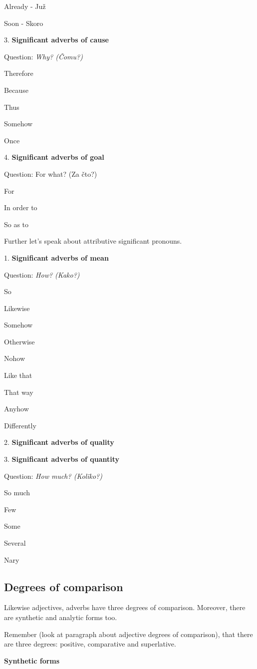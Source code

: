 Already - Juž

Soon - Skoro

3. \textbf{Significant adverbs of cause}

Question: \textit{Why? (Čomu?)}

Therefore

Because

Thus

Somehow

Once


4. \textbf{Significant adverbs of goal}

Question: For what? (Za čto?)

For

In order to

So as to


Further let’s speak about attributive significant pronouns.

1. \textbf{Significant adverbs of mean}

Question: \textit{How? (Kako?)}

So

Likewise

Somehow

Otherwise

Nohow

Like that

That way

Anyhow

Differently

2. \textbf{Significant adverbs of quality}


3.\textbf{ Significant adverbs of quantity}

Question: \textit{How much? (Kolïko?)}

So much

Few

Some

Several

Nary

\subsection{Degrees of comparison}

Likewise adjectives, adverbs have three degrees of comparison. Moreover, there are synthetic and analytic forms too. 

Remember (look at paragraph about adjective degrees of comparison), that there are three degrees: positive, comparative and superlative.

\textbf{Synthetic forms}

